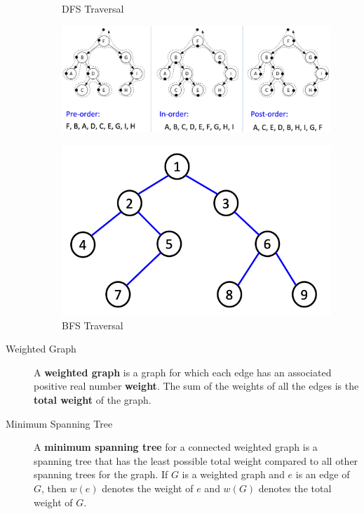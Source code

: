 \documentclass{article}
\begin{document}
\begin{description}
	\begin{figure}[H]
		\centering
		\caption{DFS Traversal}
		\includegraphics[scale=0.4]{dfs} \\
		\vspace{0.5cm}
		\caption{BFS Traversal}
		\includegraphics[scale=0.6]{bfs}
	\end{figure}
		
    \item[Weighted Graph]A \textbf{weighted graph} is a graph for which each edge has an associated positive real number \textbf{weight}. The sum of the weights of all the edges is the \textbf{total weight} of the graph. 
    \item[Minimum Spanning Tree]A \textbf{minimum spanning tree} for a connected weighted graph is a spanning tree that has the least possible total weight compared to all other spanning trees for the graph. If $G$ is a weighted graph and $e$ is an edge of $G$, then $w(e)$ denotes the weight of $e$ and $w(G)$ denotes the total weight of $G$.
    
	
\end{description}

\end{document}
